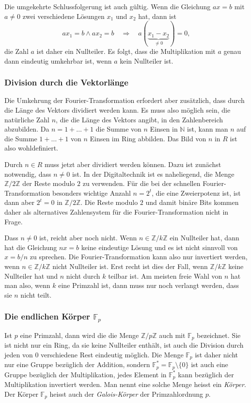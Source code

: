 Die umgekehrte Schlussfolgerung ist auch gültig.
Wenn die Gleichung $ax=b$ mit $a\ne 0$ zwei verschiedene Lösungen
$x_1$ und $x_2$ hat, dann ist
\[
ax_1=b
\wedge
ax_2=b
\quad\Rightarrow\quad
a(\underbrace{x_1-x_2}_{\displaystyle\ne 0})=0,
\]
die Zahl $a$ ist daher ein Nullteiler.
Es folgt, dass die Multiplikation mit $a$ genau dann eindeutig umkehrbar
ist, wenn $a$ kein Nullteiler ist.

%
%
\subsubsection{Division durch die Vektorlänge}
Die Umkehrung der Fourier-Transformation erfordert aber zusätzlich,
dass durch die Länge des Vektors dividiert werden kann.
Es muss also möglich sein, die natürliche Zahl $n$, die die Länge
des Vektors angibt, in den Zahlenbereich abzubilden.
Da $n = 1+\dots + 1$ die Summe von $n$ Einsen in $\mathbb{N}$ ist,
kann man $n$ auf die Summe $1+\dots+1$ von $n$ Einsen im Ring abbilden.
Das Bild von $n$ in $R$ ist also wohldefiniert.

Durch $n \in R$ muss jetzt aber dividiert werden können.
Dazu ist zunächst notwendig, dass $n\ne 0$ ist.
In der Digitaltechnik ist es naheliegend, die Menge $\mathbb{Z}/2\mathbb{Z}$
der Reste modulo $2$ zu verwenden.
Für die bei der schnellen Fourier-Transformation besonders wichtige
Anzahl $n=2^t$, die eine Zweierpotenz ist, ist dann aber $2^t=0$ in
$\mathbb{Z}/2\mathbb{Z}$.
Die Reste modulo $2$ und damit binäre Bits kommen daher als alternatives
Zahlensystem für die Fourier-Transformation nicht in Frage.

Dass $n\ne 0$ ist, reicht aber noch nicht.
Wenn $n\in \mathbb{Z}/k\mathbb{Z}$ ein Nullteiler hat, dann hat die
Gleichung $nx=b$ keine eindeutige Lösung und es ist nicht sinnvoll
von $x = b/n$ zu sprechen.
Die Fourier-Transformation kann also nur invertiert werden, wenn
$n\in \mathbb{Z}/k\mathbb{Z}$ nicht Nullteiler ist.
Erst recht ist dies der Fall, wenn $\mathbb{Z}/k\mathbb{Z}$ keine
Nullteiler hat und $n$ nicht durch $k$ teilbar ist.
Am meisten freie Wahl von $n$ hat man also, wenn $k$ eine Primzahl
ist, dann muss nur noch verlangt werden, dass sie $n$ nicht teilt.

%
%
\subsubsection{Die endlichen Körper $\mathbb{F}_p$}
Ist $p$ eine Primzahl, dann wird die
die Menge $\mathbb{Z}/p\mathbb{Z}$ auch mit $\mathbb{F}_p$
bezeichnet.
Sie ist nicht nur ein Ring, da sie keine Nullteiler enthält, ist auch
die Division durch jeden von $0$ verschiedene Rest eindeutig möglich.
Die Menge $\mathbb{F}_p$ ist daher nicht nur eine Gruppe bezüglich
der Addition, sondern $\mathbb{F}_p^*=\mathbb{F}_p\setminus\{0\}$
ist auch eine Gruppe bezüglich der Multiplikation, jedes Element 
in $\mathbb{F}_p^*$ kann bezüglich der Multiplikation invertiert
werden.
Man nennt eine solche Menge heisst ein {\em Körper}.
Der Körper $\mathbb{F}_p$ heisst auch der {\em Galois-Körper} 
der Primzahlordnung $p$.

